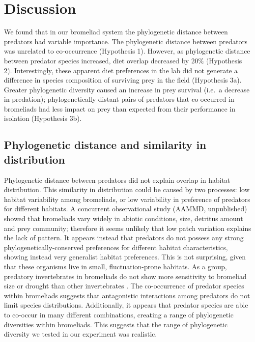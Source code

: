 \section{Discussion}\label{discussion}

We found that in our bromeliad system the phylogenetic distance between
predators had variable importance. The phylogenetic distance between
predators was unrelated to co-occurrence (Hypothesis 1). However, as
phylogenetic distance between predator species increased, diet overlap
decreased by 20\% (Hypothesis 2). Interestingly, these apparent diet
preferences in the lab did not generate a difference in species
composition of surviving prey in the field (Hypothesis 3a). Greater
phylogenetic diversity caused an increase in prey survival (i.e.~a
decrease in predation); phylogenetically distant pairs of predators that
co-occurred in bromeliads had less impact on prey than expected from
their performance in isolation (Hypothesis 3b).

\subsection{Phylogenetic distance and similarity in
distribution}\label{phylogenetic-distance-and-similarity-in-distribution}

Phylogenetic distance between predators did not explain overlap in
habitat distribution. This similarity in distribution could be caused by
two processes: low habitat variability among bromeliads, or low
variability in preference of predators for different habitats. A
concurrent observational study (AAMMD, unpublished) showed that
bromeliads vary widely in abiotic conditions, size, detritus amount and
prey community; therefore it seems unlikely that low patch variation
explains the lack of pattern. It appears instead that predators do not
possess any strong phylogenetically-conserved preferences for different
habitat characteristics, showing instead very generalist habitat
preferences. This is not surprising, given that these organisms live in
small, fluctuation-prone habitats. As a group, predatory invertebrates
in bromeliads do not show more sensitivity to bromeliad size or drought
than other invertebrates \citep{Amundrud2015}. The co-occurrence of
predator species within bromeliads suggests that antagonistic
interactions among predators do not limit species distributions.
Additionally, it appears that predator species are able to co-occur in
many different combinations, creating a range of phylogenetic
diversities within bromeliads. This suggests that the range of
phylogenetic diversity we tested in our experiment was realistic.

